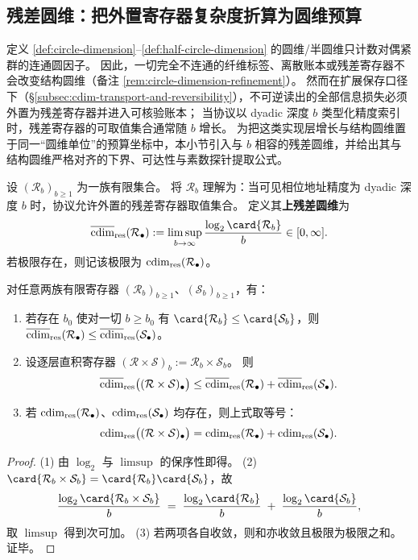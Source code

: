 \subsection{残差圆维：把外置寄存器复杂度折算为圆维预算}\label{subsec:cdim-residual-circle-dimension}
定义 \ref{def:circle-dimension}--\ref{def:half-circle-dimension} 的圆维/半圆维只计数对偶紧群的连通圆因子。
因此，一切完全不连通的纤维标签、离散账本或残差寄存器不会改变结构圆维（备注 \ref{rem:circle-dimension-refinement}）。
然而在扩展保存口径下（\S\ref{subsec:cdim-transport-and-reversibility}），不可逆读出的全部信息损失必须外置为残差寄存器并进入可核验账本；
当协议以 dyadic 深度 \(b\) 类型化精度索引时，残差寄存器的可取值集合通常随 \(b\) 增长。
为把这类实现层增长与结构圆维置于同一“圆维单位”的预算坐标中，本小节引入与 \(b\) 相容的残差圆维，并给出其与结构圆维严格对齐的下界、可达性与素数探针提取公式。

\begin{definition}[残差圆维]\label{def:cdim-residual-circle-dimension}
设 \((\mathcal{R}_b)_{b\ge 1}\) 为一族有限集合。
将 \(\mathcal{R}_b\) 理解为：当可见相位地址精度为 dyadic 深度 \(b\) 时，协议允许外置的残差寄存器取值集合。
定义其\textbf{上残差圆维}为
\[
\overline{\cdim}_{\mathrm{res}}(\mathcal{R}_\bullet)
:=\limsup_{b\to\infty}\frac{\log_2\card{\mathcal{R}_b}}{b}\in[0,\infty].
\]
若极限存在，则记该极限为 \(\operatorname{cdim}_{\mathrm{res}}(\mathcal{R}_\bullet)\)。
\end{definition}

\begin{proposition}[单调性与乘积次可加]\label{prop:cdim-residual-circle-dimension-laws}
对任意两族有限寄存器 \((\mathcal{R}_b)_{b\ge 1}\)、\((\mathcal{S}_b)_{b\ge 1}\)，有：
\begin{enumerate}
  \item 若存在 \(b_0\) 使对一切 \(b\ge b_0\) 有 \(\card{\mathcal{R}_b}\le \card{\mathcal{S}_b}\)，则
  \(
  \overline{\operatorname{cdim}}_{\mathrm{res}}(\mathcal{R}_\bullet)\le \overline{\operatorname{cdim}}_{\mathrm{res}}(\mathcal{S}_\bullet)
  \)。
  \item 设逐层直积寄存器 \((\mathcal{R}\times\mathcal{S})_b:=\mathcal{R}_b\times\mathcal{S}_b\)。
  则
  \[
  \overline{\operatorname{cdim}}_{\mathrm{res}}\bigl((\mathcal{R}\times\mathcal{S})_\bullet\bigr)
  \le
  \overline{\operatorname{cdim}}_{\mathrm{res}}(\mathcal{R}_\bullet)+\overline{\operatorname{cdim}}_{\mathrm{res}}(\mathcal{S}_\bullet).
  \]
  \item 若 \(\operatorname{cdim}_{\mathrm{res}}(\mathcal{R}_\bullet)\)、\(\operatorname{cdim}_{\mathrm{res}}(\mathcal{S}_\bullet)\) 均存在，则上式取等号：
  \[
  \operatorname{cdim}_{\mathrm{res}}\bigl((\mathcal{R}\times\mathcal{S})_\bullet\bigr)
  =
  \operatorname{cdim}_{\mathrm{res}}(\mathcal{R}_\bullet)+\operatorname{cdim}_{\mathrm{res}}(\mathcal{S}_\bullet).
  \]
\end{enumerate}
\end{proposition}
\begin{proof}
(1) 由 \(\log_2\) 与 \(\limsup\) 的保序性即得。
(2) \(\card{\mathcal{R}_b\times\mathcal{S}_b}=\card{\mathcal{R}_b}\card{\mathcal{S}_b}\)，故
\[
\frac{\log_2\card{\mathcal{R}_b\times\mathcal{S}_b}}{b}
\;=\;
\frac{\log_2\card{\mathcal{R}_b}}{b}
\;+\;
\frac{\log_2\card{\mathcal{S}_b}}{b},
\]
取 \(\limsup\) 得到次可加。
(3) 若两项各自收敛，则和亦收敛且极限为极限之和。证毕。
\end{proof}

